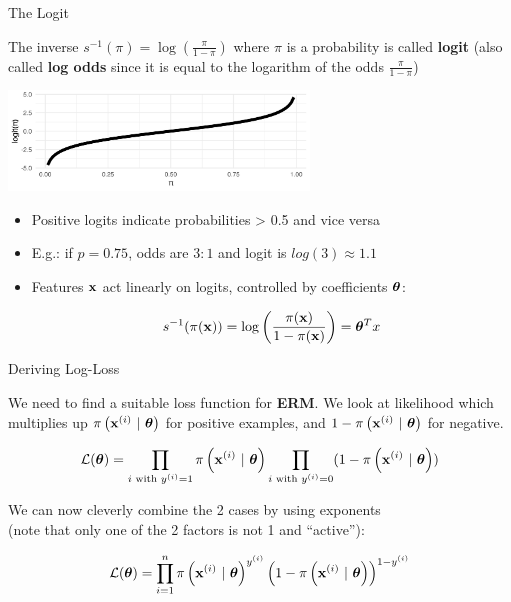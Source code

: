 \documentclass[11pt,compress,t,notes=noshow, xcolor=table]{beamer}
\begin{document}
\begin{vbframe}{The Logit}

The inverse $s^{-1}(\pi) = \log\left(\frac{\pi}{1 - \pi}\right)$ where $\pi$ is a probability is called \textbf{logit} (also called \textbf{log odds} since it is equal to the logarithm of the odds $\frac{\pi}{1-\pi}$)

\begin{center}
\includegraphics[width=0.6\textwidth]{figure/logit_function.png}
\end{center}

\begin{itemize}

\item Positive logits indicate probabilities > 0.5 and vice versa

\item E.g.: if $p = 0.75$, odds are $3:1$ and logit is $log(3) \approx 1.1$

\item Features $\mathbf{x}$ act linearly on logits, controlled by coefficients $\bm{\theta}$:

$$
s^{-1}(\pi(\mathbf{x})) = \log\left(\frac{\pi(\mathbf{x})}{1 - \pi(\mathbf{x})}\right) = \bm{\theta}^T x
$$

\end{itemize}


\end{vbframe}

\begin{vbframe}{Deriving Log-Loss}

We need to find a suitable loss function for \textbf{ERM}. We look at likelihood which multiplies up $\pi\left(\mathbf{x}^{(i)} ~|~ \bm{\theta}\right)$ for positive examples, and $1-\pi\left(\mathbf{x}^{(i)} ~|~ \bm{\theta}\right)$ for negative. 


$$
\mathcal{L}(\bm{\theta}) = \prod_{i \text{ with } y^{(i)} = 1} \pi\left(\mathbf{x}^{(i)} ~|~ \bm{\theta}\right) \prod_{i \text{ with } y^{(i)} = 0} (1-\pi\left(\mathbf{x}^{(i)} ~|~ \bm{\theta}\right)) 
$$

We can now cleverly combine the 2 cases by using exponents \\
(note that only one of the 2 factors is not 1 and \enquote{active}):

$$
\mathcal{L}(\bm{\theta}) = \prod\limits_{i=1}^n \pi\left(\mathbf{x}^{(i)} ~|~ \bm{\theta}\right)^{y^{(i)}} \left(1-\pi\left(\mathbf{x}^{(i)} ~|~ \bm{\theta}\right)\right)^{1-y^{(i)}}
$$

\end{vbframe}
\end{document}
